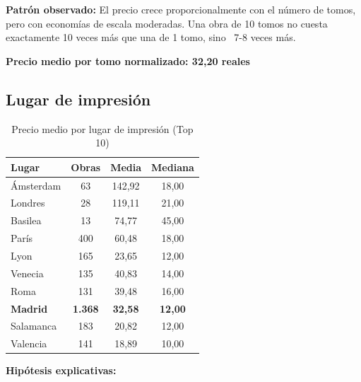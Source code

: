 \documentclass[12pt,a4paper]{article}
\begin{document}
\textbf{Patrón observado:} El precio crece proporcionalmente con el número de tomos, pero con economías de escala moderadas. Una obra de 10 tomos no cuesta exactamente 10 veces más que una de 1 tomo, sino ~7-8 veces más.

\textbf{Precio medio por tomo normalizado: 32,20 reales}

\subsection{Lugar de impresión}

\begin{table}[h]
\centering
\caption{Precio medio por lugar de impresión (Top 10)}
\begin{tabular}{lccc}
\toprule
\textbf{Lugar} & \textbf{Obras} & \textbf{Media} & \textbf{Mediana} \\
\midrule
Ámsterdam & 63 & 142,92 & 18,00 \\
Londres & 28 & 119,11 & 21,00 \\
Basilea & 13 & 74,77 & 45,00 \\
París & 400 & 60,48 & 18,00 \\
Lyon & 165 & 23,65 & 12,00 \\
Venecia & 135 & 40,83 & 14,00 \\
Roma & 131 & 39,48 & 16,00 \\
\textbf{Madrid} & \textbf{1.368} & \textbf{32,58} & \textbf{12,00} \\
Salamanca & 183 & 20,82 & 12,00 \\
Valencia & 141 & 18,89 & 10,00 \\
\bottomrule
\end{tabular}
\end{table}

\textbf{Hipótesis explicativas:}
\end{document}
